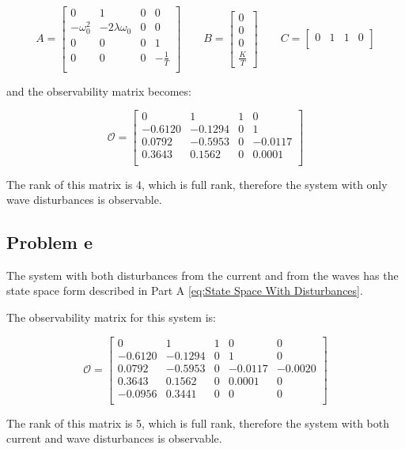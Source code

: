 \begin{equation}
    A = 
	\begin{bmatrix}
    0           & 1                 & 0 & 0\\
	-\omega_0^2 & -2\lambda\omega_0 & 0 & 0\\
	0           & 0                 & 0 & 1\\
	0           & 0                 & 0 & -\frac{1}{T}\\
	\end{bmatrix}
  \qquad
  B =
  \begin{bmatrix}
	0 \\
    0 \\
    0 \\
    \frac{K}{T}
  \end{bmatrix}
  \qquad
  C =
  \begin{bmatrix}
    0 & 1 & 1 & 0\\
  \end{bmatrix}
\end{equation}

and the observability matrix becomes:



\begin{equation}
  \bm{\mathcal{O}} =
  \begin{bmatrix}
    0      &  1       & 1   & 0 \\
   -0.6120 &  -0.1294 & 0   & 1 \\
    0.0792 &  -0.5953 & 0   & -0.0117 \\
    0.3643 &   0.1562 & 0   & 0.0001 \\
  \end{bmatrix}
\end{equation}

The rank of this matrix is 4, which is full rank, therefore the system with only wave disturbances is observable.
\subsection{Problem e}
The system with both disturbances from the current and from the waves has the state space form described in Part A \cref{eq:State Space With Disturbances}.

The observability matrix for this system is:

\begin{equation}
  \bm{\mathcal{O}} =
  \begin{bmatrix}
         0  &       1  &       1 &        0 &  0 \\
   -0.6120  & -0.1294  &       0 &        1 &  0 \\
    0.0792  & -0.5953  &       0 &  -0.0117 &  -0.0020 \\
    0.3643  &  0.1562  &       0 &   0.0001 &  0 \\
   -0.0956  &  0.3441  &       0 &        0 &  0 \\
  \end{bmatrix}
\end{equation}

The rank of this matrix is 5, which is full rank, therefore the system with both current and wave disturbances is observable.

